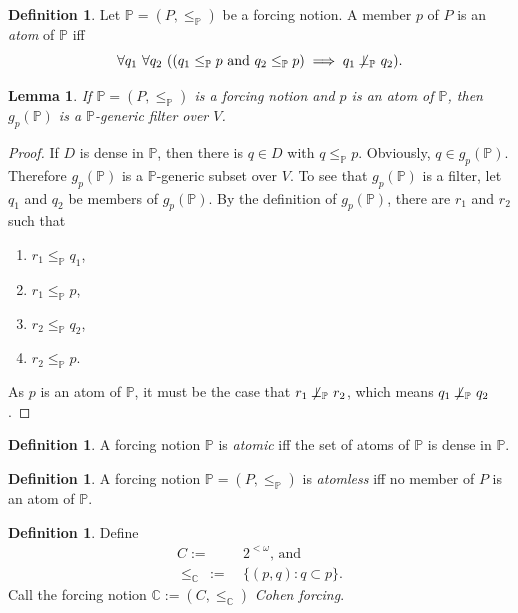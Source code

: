 \documentclass[12pt, twoside]{memoir}
\numberwithin{equation}{section}
\newtheorem{lem}[thm]{Lemma}
\theoremstyle{definition}
\newtheorem{defi}[thm]{Definition}
\theoremstyle{remark}
\theoremstyle{definition}
\theoremstyle{definition}
\theoremstyle{definition}
\theoremstyle{remark}
\begin{document}
\begin{defi}
Let $\mathbb{P} = (P, \leq_{\mathbb{P}})$ be a forcing notion. A member $p$ of $P$ is an \emph{atom} of $\mathbb{P}$ iff $$\forall q_1 \ \forall q_2 \ ((q_1 \leq_{\mathbb{P}} p \text{ and } q_2 \leq_{\mathbb{P}} p) \implies q_1 \not \! \! \bot_{\mathbb{P}} \ q_2).$$
\end{defi}

\begin{lem}\label{gpgeneric}
If $\mathbb{P} = (P, \leq_{\mathbb{P}})$ is a forcing notion and $p$ is an atom of $\mathbb{P}$, then $g_p (\mathbb{P})$ is a $\mathbb{P}$-generic filter over $V$.
\end{lem}

\begin{proof}
If $D$ is dense in $\mathbb{P}$, then there is $q \in D$ with $q \leq_{\mathbb{P}} p$. Obviously, $q \in g_p (\mathbb{P})$. Therefore $g_p (\mathbb{P})$ is a $\mathbb{P}$-generic subset over $V$. To see that $g_p (\mathbb{P})$ is a filter, let $q_1$ and $q_2$ be members of $g_p (\mathbb{P})$. By the definition of $g_p (\mathbb{P})$, there are $r_1$ and $r_2$ such that 
\begin{enumerate}[label=(\alph*)]
    \item $r_1 \leq_{\mathbb{P}} q_1$, 
    \item $r_1 \leq_{\mathbb{P}} p$,
    \item $r_2 \leq_{\mathbb{P}} q_2$,
    \item $r_2 \leq_{\mathbb{P}} p$.
\end{enumerate}
As $p$ is an atom of $\mathbb{P}$, it must be the case that $r_1 \not \! \! \bot_{\mathbb{P}} \ r_2$, which means $q_1 \not \! \! \bot_{\mathbb{P}} \ q_2$.
\end{proof}

\begin{defi}
A forcing notion $\mathbb{P}$ is \emph{atomic} iff the set of atoms of $\mathbb{P}$ is dense in $\mathbb{P}$.
\end{defi}

\begin{defi}
A forcing notion $\mathbb{P} = (P, \leq_{\mathbb{P}})$ is \emph{atomless} iff no member of $P$ is an atom of $\mathbb{P}$.
\end{defi}

\begin{defi}
Define
\begin{align*}
    C := \ & 2^{< \omega} \text{, and} \\
    \leq_{\mathbb{C}} \ := \ & \{(p, q) : q \subset p\} \text{.}
\end{align*}
Call the forcing notion $\mathbb{C} := (C, \leq_{\mathbb{C}})$ \emph{Cohen forcing}.
\end{defi}
\end{document}
